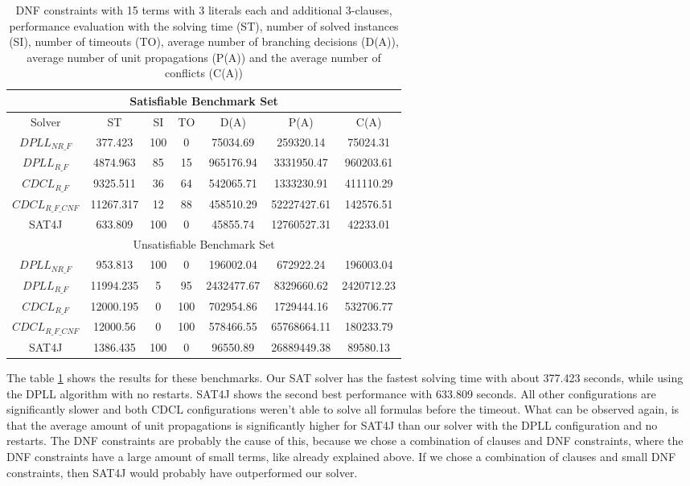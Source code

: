 \documentclass{easychair}
\begin{document}
\begin{table}
\centering
\caption{DNF constraints with 15 terms with 3 literals each and additional 3-clauses, performance evaluation with the solving time (ST), number of solved instances (SI), number of timeouts (TO), average number of branching decisions (D(A)), average number of unit propagations (P(A)) and the average number of conflicts (C(A))}
\label{tab:dnfClauseBenchmarkSAT}
\begin{tabular}{|c|c|c|c|c|c|c|}
\hline
\multicolumn{7}{|c|}{Satisfiable Benchmark Set}\\
\hline
Solver & ST & SI & TO & D(A) & P(A) & C(A)\\ 
\hline
$DPLL_{NR\_F}$ & 377.423 & 100 & 0 & 75034.69 & 259320.14 & 75024.31 \\ 
\hline
$DPLL_{R\_F}$ & 4874.963 & 85 & 15 & 965176.94 & 3331950.47 & 960203.61 \\ 
\hline
$CDCL_{R\_F}$ & 9325.511 & 36 & 64 & 542065.71 & 1333230.91 & 411110.29 \\ 
\hline
$CDCL_{R\_F\_CNF}$ & 11267.317 & 12 & 88 & 458510.29 & 52227427.61 & 142576.51 \\ 
\hline
SAT4J & 633.809 & 100 & 0 & 45855.74 & 12760527.31 & 42233.01 \\ 
\hline
\multicolumn{7}{|c|}{Unsatisfiable Benchmark Set}\\
\hline
$DPLL_{NR\_F}$ & 953.813 & 100 & 0 & 196002.04 & 672922.24 & 196003.04 \\ 
\hline
$DPLL_{R\_F}$ & 11994.235 & 5 & 95 & 2432477.67 & 8329660.62 & 2420712.23 \\ 
\hline
$CDCL_{R\_F}$ & 12000.195 & 0 & 100 & 702954.86 & 1729444.16 & 532706.77 \\ 
\hline
$CDCL_{R\_F\_CNF}$ & 12000.56 & 0 & 100 & 578466.55 & 65768664.11 & 180233.79 \\ 
\hline
SAT4J & 1386.435 & 100 & 0 & 96550.89 & 26889449.38 & 89580.13 \\ 
\hline

\end{tabular}
\end{table}

The table \ref{tab:dnfClauseBenchmarkSAT} shows the results for these benchmarks. Our SAT solver has the fastest solving time with about 377.423 seconds, while using the DPLL algorithm with no restarts. SAT4J shows the second best performance with 633.809 seconds. All other configurations are significantly slower and both CDCL configurations weren't able to solve all formulas before the timeout. What can be observed again, is that the average amount of unit propagations is significantly higher for SAT4J than our solver with the DPLL configuration and no restarts.
The DNF constraints are probably the cause of this, because we chose a combination of clauses and DNF constraints, where the DNF constraints have a large amount of small terms, like already explained above. If we chose a combination of clauses and small DNF constraints, then SAT4J would probably have outperformed our solver.
\end{document}
